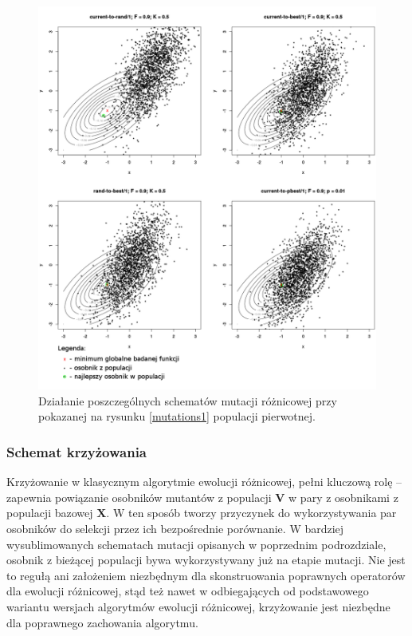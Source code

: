 \documentclass[12pt,a4paper]{report}
\begin{document}
{{{{\begin{description}
\begin{figure}[h]
\begin{center}\includegraphics[scale=0.375]{img/mutations2.png}\end{center}
\caption{Działanie poszczególnych schematów mutacji różnicowej przy pokazanej na rysunku \ref{mutations1} populacji pierwotnej.}
\label{mutations2}
\end{figure}

\end{description}
}
\subsubsection{Schemat krzyżowania}
\par{
Krzyżowanie w klasycznym algorytmie ewolucji różnicowej, pełni kluczową rolę -- zapewnia powiązanie osobników mutantów z populacji $\mathbf{V}$ w pary z osobnikami z populacji bazowej $\mathbf{X}$. W ten sposób tworzy przyczynek do wykorzystywania par osobników do selekcji przez ich bezpośrednie porównanie. W bardziej wysublimowanych schematach mutacji opisanych w poprzednim podrozdziale, osobnik z bieżącej populacji bywa wykorzystywany już na etapie mutacji. Nie jest to regułą ani założeniem niezbędnym dla skonstruowania poprawnych operatorów dla ewolucji różnicowej, stąd też nawet w odbiegających od podstawowego wariantu wersjach algorytmów ewolucji różnicowej, krzyżowanie jest niezbędne dla poprawnego zachowania algorytmu.
}

}}}
\end{document}
